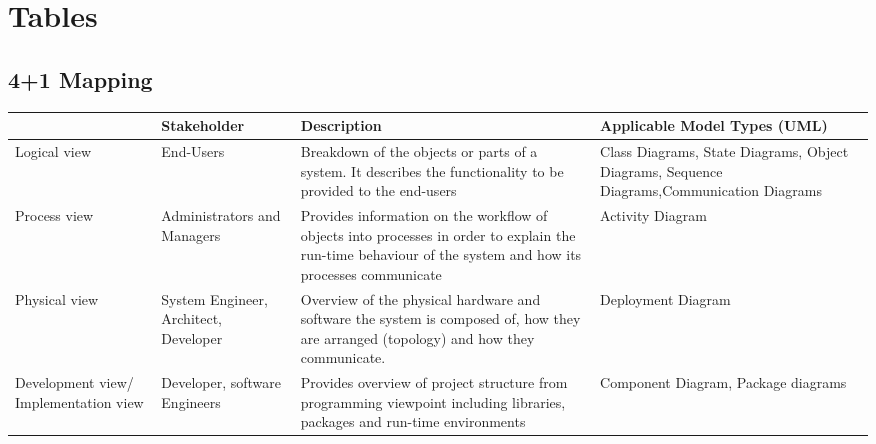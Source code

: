 \chapter{Tables}

\section{4+1 Mapping}
\begin{sidewaystable}[h]
\centering
\begin{tabularx}{\textwidth}{X X X X}
\hline
\rowcolor[HTML]{C0C0C0} 
\multicolumn{1}{|X|}{\cellcolor[HTML]{C0C0C0}\textbf{Viewpoint}} & \multicolumn{1}{X|}{\cellcolor[HTML]{C0C0C0}\textbf{Stakeholder}} & \multicolumn{1}{X|}{\cellcolor[HTML]{C0C0C0}\textbf{Description}}                                                                                                              & \multicolumn{1}{X|}{\cellcolor[HTML]{C0C0C0}\textbf{Applicable Model Types (UML)}}                             \\ \hline
\multicolumn{1}{|X|}{Logical view}                               & \multicolumn{1}{X|}{End-Users}                                    & \multicolumn{1}{X|}{Breakdown of the objects or parts of a system. It describes the functionality to be provided to the end-users}                                             & \multicolumn{1}{X|}{Class Diagrams, State Diagrams, Object Diagrams, Sequence Diagrams,Communication Diagrams} \\ \hline
\multicolumn{1}{|X|}{Process view}                               & \multicolumn{1}{X|}{Administrators and Managers}                  & \multicolumn{1}{X|}{Provides information on the workflow of objects into processes in order to explain the run-time behaviour of the system and how its processes communicate} & \multicolumn{1}{X|}{Activity Diagram}                                                                          \\ \hline
\multicolumn{1}{|X|}{Physical view}                              & \multicolumn{1}{X|}{System Engineer, Architect, Developer}        & \multicolumn{1}{X|}{Overview of the physical hardware and software the system is composed of, how they are arranged (topology) and how they communicate.}                      & \multicolumn{1}{X|}{Deployment Diagram}                                                                        \\ \hline
\multicolumn{1}{|X|}{Development view/ Implementation view}      & \multicolumn{1}{X|}{Developer, software Engineers}                & \multicolumn{1}{X|}{Provides overview of project structure from programming viewpoint including libraries, packages and run-time environments}                                 & \multicolumn{1}{X|}{Component Diagram, Package diagrams}                                                       \\ \hline

\end{tabularx}
\end{sidewaystable}

